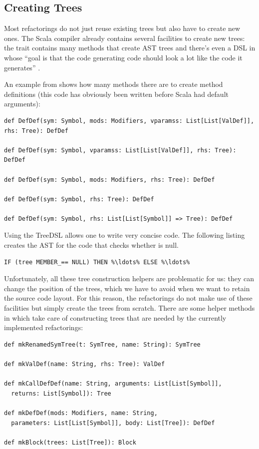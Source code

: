 \subsection{Creating Trees}

Most refactorings do not just reuse existing trees but also have to create new ones. The Scala compiler already contains several facilities to create new trees: the trait  contains many methods that create AST trees and there's even a DSL in  whose ``goal is that the code generating code should look a lot like the code it generates'' \cite{TreeDSL}.

An example from  shows how many methods there are to create method definitions (this code has obviously been written before Scala had default arguments):

\begin{lstlisting}
def DefDef(sym: Symbol, mods: Modifiers, vparamss: List[List[ValDef]], rhs: Tree): DefDef

def DefDef(sym: Symbol, vparamss: List[List[ValDef]], rhs: Tree): DefDef
  
def DefDef(sym: Symbol, mods: Modifiers, rhs: Tree): DefDef

def DefDef(sym: Symbol, rhs: Tree): DefDef

def DefDef(sym: Symbol, rhs: List[List[Symbol]] => Tree): DefDef
\end{lstlisting}

Using the TreeDSL allows one to write very concise code. The following listing creates the AST for the code that checks whether  is null.

\begin{lstlisting}
IF (tree MEMBER_== NULL) THEN %\ldots% ELSE %\ldots%
\end{lstlisting}

Unfortunately, all these tree construction helpers are problematic for us: they can change the position of the trees, which we have to avoid when we want to retain the source code layout. For this reason, the refactorings do not make use of these facilities but simply create the trees from scratch. There are some helper methods in  which take care of constructing trees that are needed by the currently implemented refactorings:

\begin{lstlisting}
def mkRenamedSymTree(t: SymTree, name: String): SymTree

def mkValDef(name: String, rhs: Tree): ValDef

def mkCallDefDef(name: String, arguments: List[List[Symbol]], 
  returns: List[Symbol]): Tree

def mkDefDef(mods: Modifiers, name: String, 
  parameters: List[List[Symbol]], body: List[Tree]): DefDef

def mkBlock(trees: List[Tree]): Block
\end{lstlisting}

